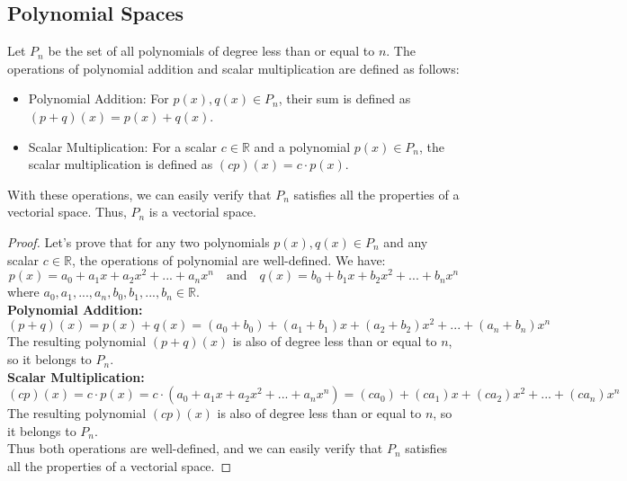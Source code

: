 \subsection{Polynomial Spaces}
\begin{definition}
    Let $P_n$ be the set of all polynomials of degree less than or equal to $n$. The operations of polynomial addition and scalar multiplication are defined as follows:
    \begin{itemize}[itemsep=1pt,label=$\circ$]
        \item Polynomial Addition: For $p(x), q(x) \in P_n$, their sum is defined as $(p + q)(x) = p(x) + q(x)$.
        \item Scalar Multiplication: For a scalar $c \in \mathbb{R}$ and a polynomial $p(x) \in P_n$, the scalar multiplication is defined as $(cp)(x) = c \cdot p(x)$.
    \end{itemize}
    With these operations, we can easily verify that $P_n$ satisfies all the properties of a vectorial space. Thus, $P_n$ is a vectorial space.
\end{definition}
\begin{proof}
    Let's prove that for any two polynomials $p(x), q(x) \in P_n$ and any scalar $c \in \mathbb{R}$, the operations of polynomial are well-defined. We have:
    \[
        p(x) = a_0 + a_1 x + a_2 x^2 + ... + a_n x^n \quad \text{and} \quad q(x) = b_0 + b_1 x + b_2 x^2 + ... + b_n x^n
    \]
    where $a_0, a_1, ..., a_n, b_0, b_1, ..., b_n \in \mathbb{R}$. \\
    \textbf{Polynomial Addition:}
    \[(p + q)(x) = p(x) + q(x) = (a_0 + b_0) + (a_1 + b_1)x + (a_2 + b_2)x^2 + ... + (a_n + b_n)x^n\]
    The resulting polynomial $(p + q)(x)$ is also of degree less than or equal to $n$, so it belongs to $P_n$. \\
    \textbf{Scalar Multiplication:}
    \[(cp)(x) = c \cdot p(x) = c \cdot (a_0 + a_1 x + a_2 x^2 + ... + a_n x^n) = (c a_0) + (c a_1)x + (c a_2)x^2 + ... + (c a_n)x^n\]
    The resulting polynomial $(cp)(x)$ is also of degree less than or equal to $n$, so it belongs to $P_n$. \\
    Thus both operations are well-defined, and we can easily verify that $P_n$ satisfies all the properties of a vectorial space.
\end{proof}

